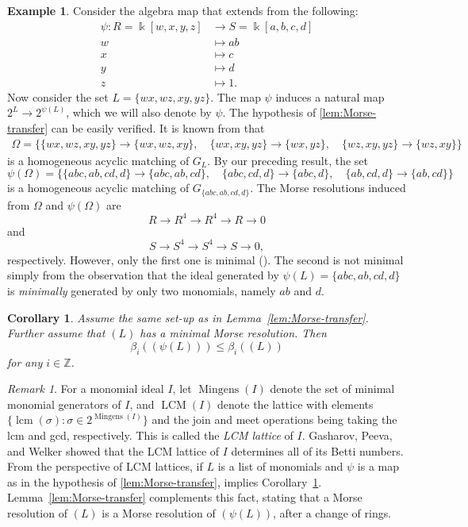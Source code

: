 \documentclass[reqno]{amsart}
\DeclareMathOperator{\lcm}{lcm}
\DeclareMathOperator{\mingens}{Mingens}
\newtheorem{corollary}[theorem]{Corollary}
\theoremstyle{definition}
\newtheorem{example}[theorem]{Example}
\theoremstyle{remark}
\newtheorem{remark}[theorem]{Remark}
\numberwithin{equation}{section}
\begin{document}
\begin{example}
    Consider the algebra map that extends from the following:
    \begin{align*}
        \psi\colon R=\Bbbk[w,x,y,z]&\to S=\Bbbk[a,b,c,d]\\
        w&\mapsto ab\\
        x&\mapsto c\\
        y&\mapsto d\\
        z&\mapsto 1.
    \end{align*}
    Now consider the set $L=\{wx,wz,xy,yz\}$. The map $\psi$ induces a natural map $2^L\to 2^{\psi(L)}$, which we will also denote by $\psi$. The hypothesis of \cref{lem:Morse-transfer} can be easily verified. It is known from \cite[Example 2.13]{CK24} that
    \begin{multline*}
        \Omega = \{ \{wx,wz,xy,yz\}\to \{wx,wz,xy\}, \quad \{wx,xy,yz\}\to \{wx,yz\}, \quad \{wz,xy,yz\}\to \{wz,xy\} \}
    \end{multline*}
    is a homogeneous acyclic matching of $G_L$. By our preceding result, the set
    \[
    \psi(\Omega) = \{ \{abc,ab,cd,d\}\to \{abc,ab,cd\}, \quad \{abc,cd,d\}\to \{abc,d\}, \quad \{ab,cd,d\}\to \{ab,cd\} \}
    \]
    is a homogeneous acyclic matching of $G_{\{abc,ab,cd,d\}}$. The Morse resolutions induced from $\Omega$ and $\psi(\Omega)$ are
    \[
    R\to R^4\to R^4\to R\to 0
    \]
    and 
    \[
    S\to S^4\to S^4\to S\to 0,
    \]
    respectively. However, only the first one is minimal (\cite[Example 2.13]{CK24}). The second is not minimal simply from the observation that the ideal generated by $\psi(L)=\{abc,ab,cd,d\}$ is \emph{minimally} generated by only two monomials, namely $ab$ and $d$.
\end{example}

\begin{corollary}\label{cor:betti-bound-Morse-transfer}
    Assume the same set-up as in Lemma~\ref{lem:Morse-transfer}. Further assume that $(L)$ has a minimal Morse resolution. Then
    \[
    \beta_i((\psi(L)))\leq \beta_{i}((L))
    \]
    for any $i\in \mathbb{Z}$.
\end{corollary}

\begin{remark}\label{rem:lcm-lattice}
    For a monomial ideal $I$, let $\mingens(I)$ denote the set of minimal monomial generators of $I$, and $\operatorname{LCM}(I)$ denote the lattice with elements $\{ \lcm(\sigma)\colon \sigma\in 2^{\mingens(I)} \}$ and the join and meet operations being taking the lcm and gcd, respectively. This is called the \emph{LCM lattice} of $I$. Gasharov, Peeva, and Welker \cite{GPW99} showed that the LCM lattice of $I$ determines all of its Betti numbers. From the perspective of LCM lattices, if $L$ is a list of monomials and $\psi$ is a map as in the hypothesis of \cref{lem:Morse-transfer}, \cite[Theorem 3.3]{GPW99} implies Corollary~\ref{cor:betti-bound-Morse-transfer}. Lemma~\ref{lem:Morse-transfer} complements this fact, stating that a Morse resolution of $(L)$ is a Morse resolution of $(\psi(L))$, after a change of rings. 
\end{remark}
\end{document}
